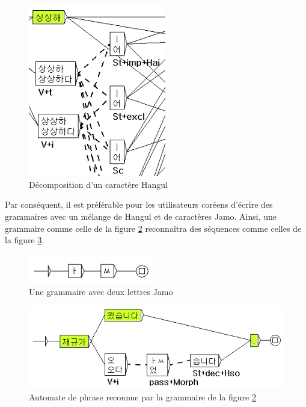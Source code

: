 \begin{figure}[!ht]
\begin{center}
\includegraphics[width=6cm]{resources/img/fig7-korean2.png}
\caption{Décomposition d'un caractère Hangul\label{fig7-korean2}}
\end{center}
\end{figure}

\bigskip
\noindent Par conséquent, il est préférable pour les utilisateurs coréens d'écrire des grammaires
avec un mélange de Hangul et de caractères Jamo. Ainsi, une grammaire comme celle de la figure
\ref{fig7-korean3} reconnaîtra des séquences comme celles de la figure \ref{fig7-korean4}.

\begin{figure}[!ht]
\begin{center}
\includegraphics[width=5.5cm]{resources/img/fig7-korean3.png}
\caption{Une grammaire avec deux lettres Jamo\label{fig7-korean3}}
\end{center}
\end{figure}

\begin{figure}[!ht]
\begin{center}
\includegraphics[width=13cm]{resources/img/fig7-korean4.png}
\caption{Automate de phrase reconnue par la grammaire de la
figure \ref{fig7-korean3}\label{fig7-korean4}}
\end{center}
\end{figure}

